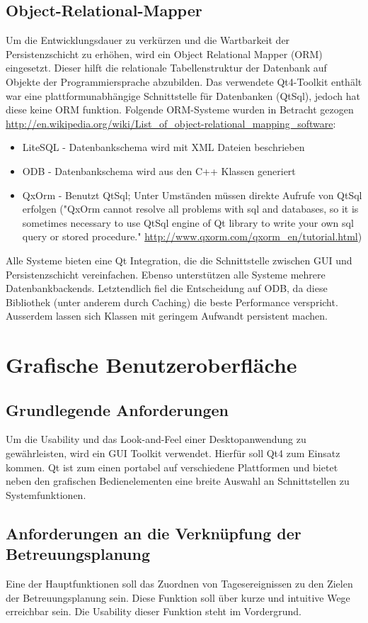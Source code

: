 \documentclass[a4paper,10pt]{article}
\begin{document}
\subsection{Object-Relational-Mapper}
Um die Entwicklungsdauer zu verkürzen und die Wartbarkeit der Persistenzschicht zu erhöhen, wird ein Object Relational Mapper (ORM) eingesetzt. 
Dieser hilft die relationale Tabellenstruktur der Datenbank auf Objekte der Programmiersprache abzubilden.
Das verwendete Qt4-Toolkit enthält war eine plattformunabhängige Schnittstelle für Datenbanken (QtSql), jedoch hat diese keine ORM funktion.
Folgende ORM-Systeme wurden in Betracht gezogen \newline\url{http://en.wikipedia.org/wiki/List_of_object-relational_mapping_software}:
\begin{itemize}
	\item LiteSQL - Datenbankschema wird mit XML Dateien beschrieben
	\item ODB - Datenbankschema wird aus den C++ Klassen generiert
	\item QxOrm - Benutzt QtSql; Unter Umständen müssen direkte Aufrufe von QtSql erfolgen ("QxOrm cannot resolve all problems with sql and databases, so it is sometimes necessary to use QtSql engine of Qt library to write your own sql query or stored procedure." \url{http://www.qxorm.com/qxorm_en/tutorial.html})
\end{itemize}
Alle Systeme bieten eine Qt Integration, die die Schnittstelle zwischen GUI und Persistenzschicht vereinfachen. Ebenso unterstützen alle Systeme mehrere Datenbankbackends.
Letztendlich fiel die Entscheidung auf ODB, da diese Bibliothek (unter anderem durch Caching) die beste Performance verspricht. Ausserdem lassen sich Klassen mit geringem Aufwandt persistent machen.


\section{Grafische Benutzeroberfläche}
\subsection{Grundlegende Anforderungen}
Um die Usability und das Look-and-Feel einer Desktopanwendung zu gewährleisten, wird ein GUI Toolkit verwendet.
Hierfür soll Qt4 zum Einsatz kommen. Qt ist zum einen portabel auf verschiedene Plattformen 
und bietet neben den grafischen Bedienelementen eine breite Auswahl an Schnittstellen zu Systemfunktionen.
\subsection{Anforderungen an die Verknüpfung der Betreuungsplanung}
Eine der Hauptfunktionen soll das Zuordnen von Tagesereignissen zu den Zielen der Betreuungsplanung sein. Diese Funktion soll über 
kurze und intuitive Wege erreichbar sein. Die Usability dieser Funktion steht im Vordergrund.
\end{document}
